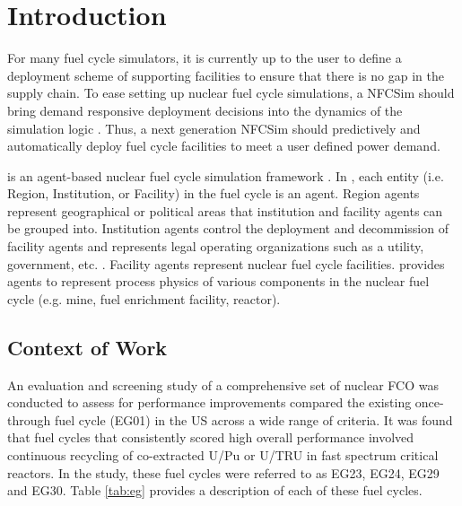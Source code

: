 \section{Introduction}
For many fuel cycle simulators, it is currently up to the user 
to define a deployment scheme of supporting facilities to ensure 
that there is no gap in the supply chain. 
To ease setting up nuclear fuel cycle simulations, a \gls{NFCSim}
should bring demand responsive deployment decisions into 
the dynamics of the simulation logic \cite{huff_current_2017}. 
Thus, a next generation \gls{NFCSim} should predictively and 
automatically deploy fuel cycle facilities to meet a user defined 
power demand. 

\Cyclus is an agent-based nuclear fuel cycle simulation framework 
\cite{huff_fundamental_2016}. 
In \Cyclus, each entity (i.e. Region, Institution, or Facility) in the 
fuel cycle is an agent. 
Region agents represent geographical or political areas that institution
and facility agents can be grouped into. 
Institution agents control the 
deployment and decommission of facility agents 
and represents legal operating organizations such as a 
utility, government, etc. \cite{huff_fundamental_2016}. 
Facility agents represent nuclear fuel cycle facilities. 
\Cycamore \cite{carlsen_cycamore_2014}
provides agents to represent process physics of various 
components in the nuclear fuel cycle (e.g. mine, fuel enrichment 
facility, reactor). 

\subsection{Context of Work}
An evaluation and screening study of a comprehensive set of nuclear 
\gls{FCO} \cite{wigeland_nuclear_2014} was conducted to assess 
for performance improvements compared the existing once-through 
fuel cycle (EG01) in the \gls{US} across a wide range of criteria. 
It was found that fuel cycles that consistently scored high 
overall performance involved continuous recycling
of co-extracted U/Pu or U/TRU in fast spectrum critical reactors. 
In the study, these fuel cycles were referred to as EG23, EG24, 
EG29 and EG30. 
Table \ref{tab:eg} provides a description of each of these fuel 
cycles. 

